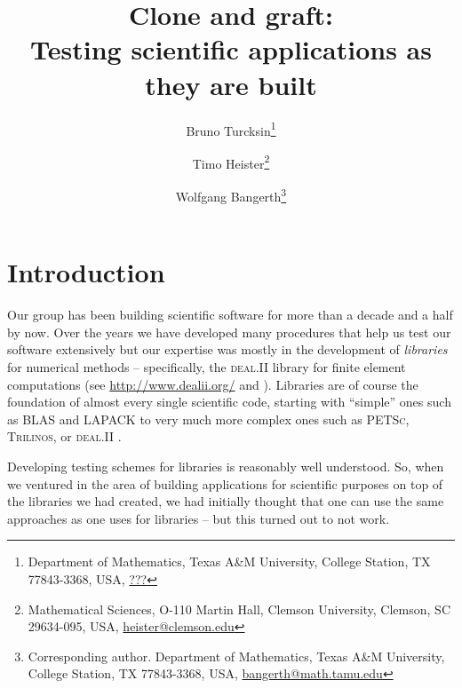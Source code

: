 \documentclass{article}
\newcommand{\dealii}{{\textsc{deal.II}}}
\newcommand{\trilinos}{{\textsc{Trilinos}}}
\newcommand{\petsc}{\textsc{PETSc}}
\begin{document}

\title{Clone and graft:\\ Testing scientific
  applications as they are built}

\author{Bruno Turcksin\footnote{Department of Mathematics, Texas A\&M
    University, College Station, TX 77843-3368, USA, \url{???}}
\and
   Timo Heister\footnote{Mathematical Sciences, O-110 Martin Hall, Clemson University,
     Clemson, SC 29634-095, USA, \url{heister@clemson.edu}}
\and
   Wolfgang Bangerth\footnote{Corresponding author. Department of Mathematics, Texas A\&M
     University, College Station, TX 77843-3368, USA, \url{bangerth@math.tamu.edu}}}


\maketitle

\section{Introduction}

Our group has been building scientific software for more than a decade and a
half by now. Over the years we have developed many procedures that help us
test our software extensively but our expertise was mostly in the development
of \textit{libraries} for numerical methods -- specifically, the \dealii{}
library for finite element computations (see
\url{http://www.dealii.org/} and \cite{BHK07,BK99m}). Libraries are of course the foundation of
almost every single scientific code, starting with ``simple'' ones such as
BLAS and LAPACK to very much more complex ones such as \petsc{}, \trilinos{}, or
\dealii{} \cite{petsc,trilinos,trilinos-web-page}.

Developing testing schemes for libraries is reasonably well understood. So,
when we ventured in the area of building applications for scientific purposes
on top of the libraries we had created, we had initially thought that one can
use the same approaches as one uses for libraries -- but this turned out to
not work.
\end{document}
